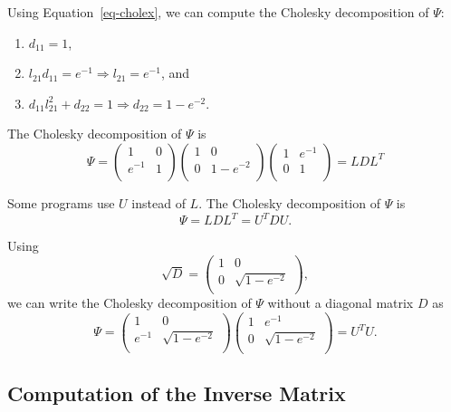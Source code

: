 \documentclass[
  letterpaper,
  DIV=11,
  numbers=noendperiod]{scrreprt}
\providecommand{\tightlist}{%
  \setlength{\itemsep}{0pt}\setlength{\parskip}{0pt}}\usepackage{longtable,booktabs,array}
\begin{document}
Using Equation~\ref{eq-cholex}, we can compute the Cholesky
decomposition of \(\Psi\):

\begin{enumerate}
\def\labelenumi{\arabic{enumi}.}
\tightlist
\item
  \(d_{11} = 1\),
\item
  \(l_{21}d_{11} = e^{-1} \Rightarrow l_{21} = e^{-1}\), and
\item
  \(d_{11} l_{21}^2 + d_{22} = 1 \Rightarrow d_{22} = 1 - e^{-2}\).
\end{enumerate}

The Cholesky decomposition of \(\Psi\) is \[
\Psi = \begin{pmatrix}
1 & 0\\
e^{-1} & 1\\
\end{pmatrix}
\begin{pmatrix}
1 & 0\\
0 & 1 - e^{-2}\\
\end{pmatrix}
\begin{pmatrix}
1 & e^{-1}\\
0 & 1\\
\end{pmatrix}
= LDL^T\]

Some programs use \(U\) instead of \(L\). The Cholesky decomposition of
\(\Psi\) is \[
\Psi = LDL^T = U^TDU.
\]

Using \[
\sqrt{D} =\begin{pmatrix}
1 & 0\\
0 & \sqrt{1 - e^{-2}}\\
\end{pmatrix},
\] we can write the Cholesky decomposition of \(\Psi\) without a
diagonal matrix \(D\) as \[
\Psi = \begin{pmatrix}
1 & 0\\
e^{-1} & \sqrt{1 - e^{-2}}\\
\end{pmatrix}
\begin{pmatrix}
1 & e^{-1}\\
0 & \sqrt{1 - e^{-2}}\\
\end{pmatrix}
= U^TU.
\]

\subsection{Computation of the Inverse
Matrix}\label{computation-of-the-inverse-matrix}
\end{document}
